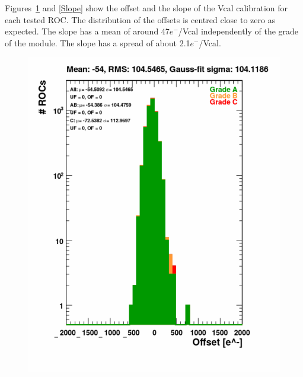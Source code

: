 \documentclass[a4paper,12pt,twoside]{article}
\begin{document}
\begin{itemize}
Figures~\ref{Offset} and \ref{Slope} show the offset and the slope of the Vcal calibration for each tested ROC. The distribution of the offsets is centred close to zero as expected. The slope has a mean of around 47$e^{-}$/Vcal independently of the grade of the module. The slope has a spread of about 2.1$e^{-}$/Vcal.
\begin{figure} [h!]
\centering
\begin{minipage}{.48\textwidth}
  \centering
  \includegraphics[width=\textwidth]{./Figures/Xray_VcalOffset.pdf}
  \label{Offset}
\end{minipage}%
\hspace{2mm}
\begin{minipage}{.48\textwidth}
  \centering

\end{minipage}
\end{figure}
\end{itemize}
\end{document}
